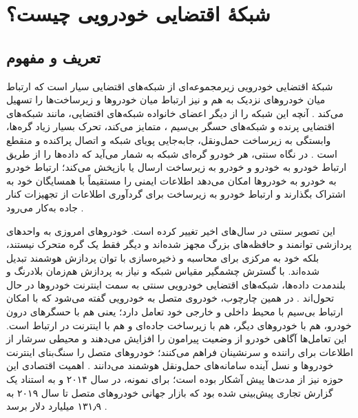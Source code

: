 \documentclass[12pt,a4paper]{article}
\begin{document}
\section{شبکهٔ اقتضایی خودرویی چیست؟}

\subsection{تعریف و مفهوم}

شبکهٔ اقتضایی خودرویی زیرمجموعه‌ای از شبکه‌های اقتضایی سیار  است که ارتباط میان خودرو‌های نزدیک به هم و نیز ارتباط میان خودرو‌ها و زیرساخت‌ها را تسهیل می‌کند \cite{hozouriOverviewVANETVehicular2023}. آنچه این شبکه را از دیگر اعضای خانواده شبکه‌های اقتضایی، مانند شبکه‌های اقتضایی پرنده  و شبکه‌های حسگر بی‌سیم ، متمایز می‌کند، تحرک بسیار زیاد گره‌ها، وابستگی به زیرساخت حمل‌ونقل، جابه‌جایی پویای شبکه و اتصال پراکنده و منقطع است \cite{hozouriOverviewVANETVehicular2023}. در نگاه سنتی، هر خودرو گره‌ای شبکه به شمار می‌آید که داده‌ها را از طریق ارتباط خودرو به خودرو و خودرو به زیرساخت ارسال یا بازپخش می‌کند؛ ارتباط خودرو به خودرو به خودرو‌ها امکان می‌دهد اطلاعات ایمنی را مستقیماً با همسایگان خود به اشتراک بگذارند و ارتباط خودرو به زیرساخت برای گردآوری اطلاعات از تجهیزات کنار جاده به‌کار می‌رود \cite{xuInternetVehiclesBig2018}.

این تصویر سنتی در سال‌های اخیر تغییر کرده است. خودرو‌های امروزی به واحد‌های پردازشی توانمند و حافظه‌های بزرگ مجهز شده‌اند و دیگر فقط یک گره متحرک نیستند، بلکه خود به مرکزی برای محاسبه و ذخیره‌سازی با توان پردازش هوشمند تبدیل شده‌اند. با گسترش چشمگیر مقیاس شبکه و نیاز به پردازش هم‌زمان بلادرنگ و بلندمدت داده‌ها، شبکه‌های اقتضایی خودرویی سنتی به سمت اینترنت خودرو‌ها  در حال تحول‌اند \cite{xuInternetVehiclesBig2018}. در همین چارچوب، خودروی متصل به خودرویی گفته می‌شود که با امکان ارتباط بی‌سیم با محیط داخلی و خارجی خود تعامل دارد؛ یعنی هم با حسگر‌های درون خودرو، هم با خودرو‌های دیگر، هم با زیرساخت جاده‌ای و هم با اینترنت در ارتباط است. این تعامل‌ها آگاهی خودرو از وضعیت پیرامون را افزایش می‌دهند و محیطی سرشار از اطلاعات برای راننده و سرنشینان فراهم می‌کنند؛ خودرو‌های متصل را سنگ‌بنای اینترنت خودرو‌ها و نسل آینده سامانه‌های حمل‌ونقل هوشمند  می‌دانند \cite{luConnectedVehiclesSolutions2014}. اهمیت اقتصادی این حوزه نیز از مدت‌ها پیش آشکار بوده است؛ برای نمونه، در سال ۲۰۱۴ و به استناد یک گزارش تجاری پیش‌بینی شده بود که بازار جهانی خودرو‌های متصل تا سال ۲۰۱۹ به ۱۳۱٫۹ میلیارد دلار برسد \cite{luConnectedVehiclesSolutions2014}.
\end{document}
